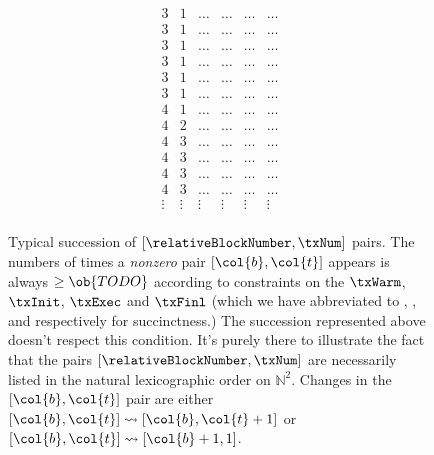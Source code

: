 \begin{figure}
\[\begin{array}{|c|c||c|c|c|c|}
			3                    & 1      & \dots        & \dots        & \dots        & \dots        \\
			3                    & 1      & \dots        & \dots        & \dots        & \dots        \\
			3                    & 1      & \dots        & \dots        & \dots        & \dots        \\
			3                    & 1      & \dots        & \dots        & \dots        & \dots        \\
			3                    & 1      & \dots        & \dots        & \dots        & \dots        \\
			3                    & 1      & \dots        & \dots        & \dots        & \dots        \\ \hline\hline
			4                    & 1      & \dots        & \dots        & \dots        & \dots        \\ \hline
			4                    & 2      & \dots        & \dots        & \dots        & \dots        \\ \hline
			4                    & 3      & \dots        & \dots        & \dots        & \dots        \\
			4                    & 3      & \dots        & \dots        & \dots        & \dots        \\
			4                    & 3      & \dots        & \dots        & \dots        & \dots        \\
			4                    & 3      & \dots        & \dots        & \dots        & \dots        \\
			\vdots               & \vdots & \vdots       & \vdots       & \vdots       & \vdots       \\
		\end{array}
	\]
	\caption{Typical succession of $[ \relativeBlockNumber, \txNum ]$ pairs. The numbers of times a \emph{nonzero} pair $[\col{b}, \col{t}]$ appears is always $\geq \ob{TODO}$ according to constraints on the
	$\txWarm$,
	$\txInit$,
	$\txExec$ and
	$\txFinl$ (which we have abbreviated to
	,
	,
	 and
	 respectively for succinctness.) The succession represented above doesn't respect this condition. It's purely there to illustrate the fact that the pairs $[ \relativeBlockNumber, \txNum ]$ are necessarily listed in the natural lexicographic order on $\mathbb{N}^2$. Changes in the $[ \col{b}, \col{t} ]$ pair are either
	$[ \col{b}, \col{t} ]\rightsquigarrow [ \col{b}, \col{t} + 1]$ or
	$[ \col{b}, \col{t} ]\rightsquigarrow [ \col{b} + 1, 1]$. }
\end{figure}
